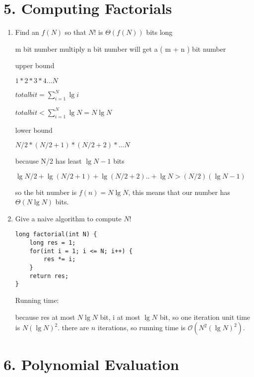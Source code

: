 \documentclass[11pt]{article}
\newenvironment{qparts}{\begin{enumerate}[{(}a{)}]}{\end{enumerate}}
\begin{document}
\section*{5. Computing Factorials}
\begin{qparts}

\item Find an $ f(N) $ so that $ N! $ is $ \Theta(f(N)) $ bits long

m bit number multiply n bit number will get a ( m + n ) bit number

upper bound

$ 1 * 2 * 3 * 4  ...  N $

$ totalbit = \sum_{i=1}^{N}\lg{i} $

$ totalbit < \sum_{i=1}^{N}\lg{N} = N\lg{N} $

lower bound

$ N/2 * (N/2+1) * (N/2+2) * ... N $

because N/2 has least $ \lg{N} -1 $ bits 

$ \lg{N/2} + \lg{(N/2+1)} + \lg{(N/2+2)} .. + \lg{N}  >  (N/2)(\lg{N}-1) $

so the bit number is $ f(n) = N\lg{N} $, this means that our number has  $ \Theta{(N\lg{N})} $ bits.

\item Give a naive algorithm to compute $ N! $

\begin{lstlisting}
long factorial(int N) {
    long res = 1;
    for(int i = 1; i <= N; i++) {
        res *= i;
    }
    return res;
}
\end{lstlisting}

Running time:

because res at most $ N\lg{N} $ bit, i at most $ \lg{N} $ bit, so one iteration unit time is $ N(\lg{N})^2 $.
there are $ n $ iterations, so running time is $ \mathcal{O}(N^2(\lg{N})^2) $.
\end{qparts}

\section*{6. Polynomial Evaluation}
\end{document}
